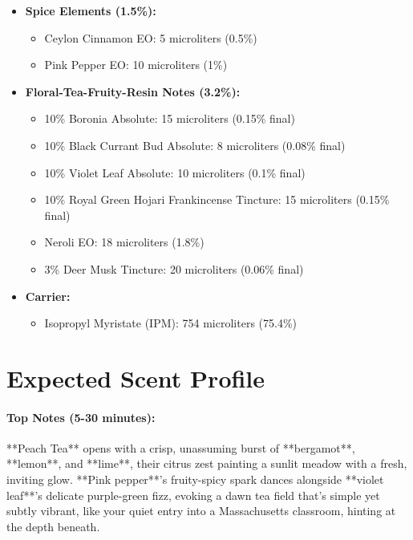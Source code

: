 \documentclass{article}
\begin{document}
\begin{center}
\begin{itemize}[leftmargin=*]
  \item \textcolor{colaRed}{\textbf{Spice Elements (1.5\%):}}
  \begin{itemize}
    \item Ceylon Cinnamon EO: 5 microliters (0.5\%)
    \item Pink Pepper EO: 10 microliters (1\%)
  \end{itemize}
  
  \item \textcolor{violetPurple}{\textbf{Floral-Tea-Fruity-Resin Notes (3.2\%):}}
  \begin{itemize}
    \item 10\% Boronia Absolute: 15 microliters (0.15\% final)
    \item 10\% Black Currant Bud Absolute: 8 microliters (0.08\% final)
    \item 10\% Violet Leaf Absolute: 10 microliters (0.1\% final)
    \item 10\% Royal Green Hojari Frankincense Tincture: 15 microliters (0.15\% final)
    \item Neroli EO: 18 microliters (1.8\%)
    \item 3\% Deer Musk Tincture: 20 microliters (0.06\% final)
  \end{itemize}
  
  \item \textcolor{colaBrown}{\textbf{Carrier:}}
  \begin{itemize}
    \item Isopropyl Myristate (IPM): 754 microliters (75.4\%)
  \end{itemize}
\end{itemize}

\section*{Expected Scent Profile}

\paragraph{\textcolor{colaRed}{\textbf{Top Notes (5-30 minutes):}}}
**Peach Tea** opens with a crisp, unassuming burst of **bergamot**, **lemon**, and **lime**, their citrus zest painting a sunlit meadow with a fresh, inviting glow. **Pink pepper**’s fruity-spicy spark dances alongside **violet leaf**’s delicate purple-green fizz, evoking a dawn tea field that’s simple yet subtly vibrant, like your quiet entry into a Massachusetts classroom, hinting at the depth beneath.


\end{center}
\end{document}

